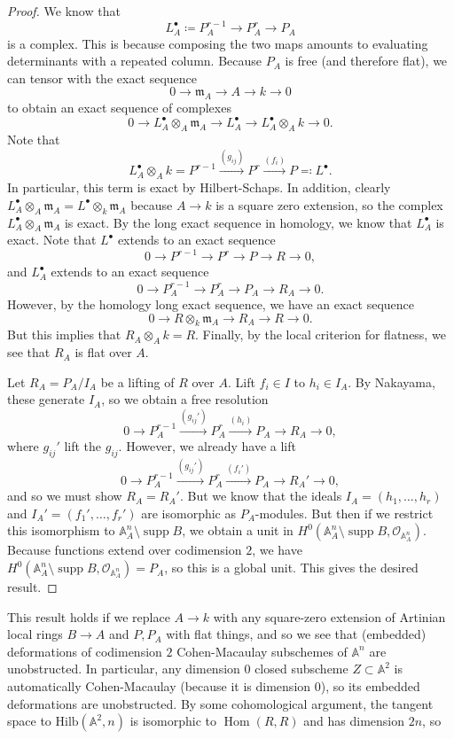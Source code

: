 \documentclass{amsart}
\theoremstyle{definition}
\theoremstyle{remark}
\theoremstyle{plain}
\theoremstyle{definition}
\theoremstyle{remark}
\newcommand{\A}{\mathbb{A}}
\newcommand{\mc}[1]{\mathcal{#1}}
\newcommand{\mf}[1]{\mathfrak{#1}}
\newcommand{\mr}[1]{\mathrm{#1}}
\newcommand{\1}{\mathbf{1}}
\newcommand{\2}{\mathbf{2}}
\newcommand{\3}{\mathbf{3}}
\DeclareMathOperator{\Hom}{Hom}
\DeclareMathOperator{\supp}{supp}
\begin{document}
\begin{proof}
    We know that 
    \[ L_A^{\bullet} \coloneqq P_A^{r-1} \to P_A^r \to P_A \]
    is a complex. This is because composing the two maps amounts to evaluating determinants with a repeated column. Because $P_A$ is free (and therefore flat), we can tensor with the exact sequence
    \[ 0 \to \mf{m}_A \to A \to k \to 0 \]
    to obtain an exact sequence of complexes
    \[ 0 \to L_A^{\bullet} \otimes_A \mf{m}_A \to L_A^{\bullet} \to L_A^{\bullet} \otimes_A k \to 0. \]
    Note that 
    \[ L_A^{\bullet} \otimes_A k = P^{r-1} \xrightarrow{(g_{ij})} P^r \xrightarrow{(f_i)} P \eqqcolon L^{\bullet}. \]
    In particular, this term is exact by Hilbert-Schaps. In addition, clearly $L_A^{\bullet} \otimes_A \mf{m}_A = L^{\bullet} \otimes_k \mf{m}_A$ because $A \to k$ is a square zero extension, so the complex $L_A^{\bullet} \otimes_A \mf{m}_A$ is exact. By the long exact sequence in homology, we know that $L_A^{\bullet}$ is exact. Note that $L^{\bullet}$ extends to an exact sequence
    \[ 0 \to P^{r-1} \to P^r \to P \to R \to 0, \]
    and $L_A^{\bullet}$ extends to an exact sequence
    \[ 0 \to P_A^{r-1} \to P_A^r \to P_A \to R_A \to 0. \]
    However, by the homology long exact sequence, we have an exact sequence
    \[ 0 \to R \otimes_k \mf{m}_A \to R_A \to R \to 0. \]
    But this implies that $R_A \otimes_A k = R$. Finally, by the local criterion for flatness, we see that $R_A$ is flat over $A$.

    Let $R_A = P_A / I_A$ be a lifting of $R$ over $A$. Lift $f_i \in I$ to $h_i \in I_A$. By Nakayama, these generate $I_A$, so we obtain a free resolution
    \[ 0 \to P_A^{r-1} \xrightarrow{(g_{ij}')} P_A^r \xrightarrow{(h_i)} P_A \to R_A \to 0, \]
    where $g_{ij}'$ lift the $g_{ij}$. However, we already have a lift
    \[ 0 \to P_A^{r-1} \xrightarrow{(g_{ij}')} P_A^r \xrightarrow{(f_i')} P_A \to R_A' \to 0, \]
    and so we must show $R_A = R_A'$. But we know that the ideals $I_A = (h_1, \ldots, h_r)$ and $I_A' = (f_1', \ldots, f_r')$ are isomorphic as $P_A$-modules. But then if we restrict this isomorphism to $\A^n_A \setminus \supp B$, we obtain a unit in $H^0(\A^n_A \setminus \supp B, \mc{O}_{\A^n_A})$. Because functions extend over codimension $2$, we have $H^0(\A^n_A \setminus \supp B, \mc{O}_{\A^n_A}) = P_A$, so this is a global unit. This gives the desired result.
\end{proof}

This result holds if we replace $A \to k$ with any square-zero extension of Artinian local rings $B \to A$ and $P, P_A$ with flat things, and so we see that (embedded) deformations of codimension $2$ Cohen-Macaulay subschemes of $\A^n$ are unobstructed. In particular, any dimension $0$ closed subscheme $Z \subset \A^2$ is automatically Cohen-Macaulay (because it is dimension $0$), so its embedded deformations are unobstructed. By some cohomological argument, the tangent space to $\mr{Hilb}(\A^2, n)$ is isomorphic to $\Hom(R, R)$ and has dimension $2n$, so 
\end{document}
